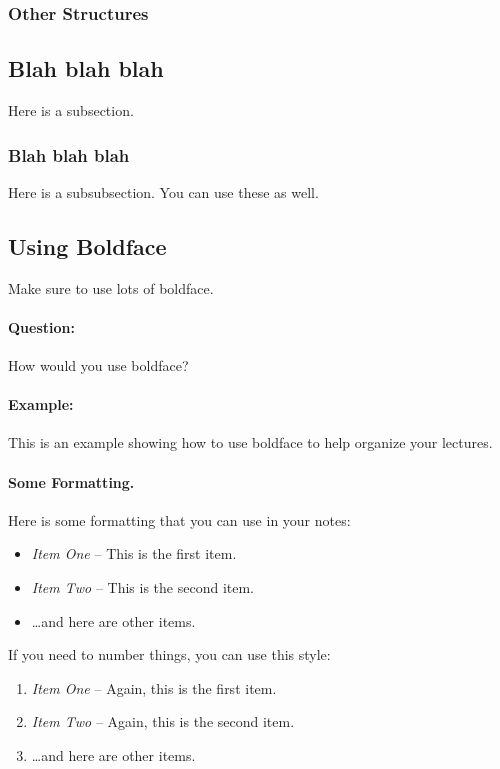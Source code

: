 \documentclass[11pt]{article}
\begin{document}
\subsubsection{Other Structures}



\subsection{Blah blah blah}
Here is a subsection.

\subsubsection{Blah blah blah}
Here is a subsubsection. You can use these as well.

\subsection{Using Boldface}
Make sure to use lots of boldface.

\paragraph{Question:}
How would you use boldface?

\paragraph{Example:}
This is an example showing how to use boldface to 
help organize your lectures.


\paragraph{Some Formatting.}
Here is some formatting that you can use in your notes:
\begin{itemize}
\item {\em Item One} -- This is the first item.
\item {\em Item Two} -- This is the second item.
\item \dots and here are other items.
\end{itemize}

If you need to number things, you can use this style:
\begin{enumerate}
\item {\em Item One} -- Again, this is the first item.
\item {\em Item Two} -- Again, this is the second item.
\item \dots and here are other items.
\end{enumerate}
\end{document}
